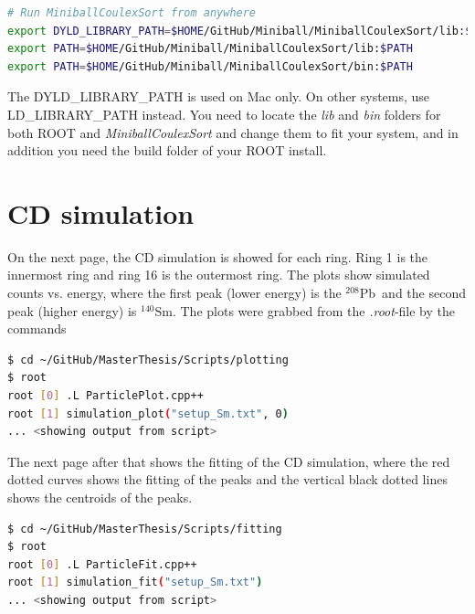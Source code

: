 \documentclass[twoside,english]{uiofysmaster/uiofysmaster}
\newcommand{\Sm}{$^{140}$Sm} %
\newcommand{\Pb}{$^{208}$Pb}
\begin{document}
\begin{appendices}
\begin{lstlisting}[language=sh]
# Run MiniballCoulexSort from anywhere
export DYLD_LIBRARY_PATH=$HOME/GitHub/Miniball/MiniballCoulexSort/lib:$DYLD_LIBRARY_PATH
export PATH=$HOME/GitHub/Miniball/MiniballCoulexSort/lib:$PATH
export PATH=$HOME/GitHub/Miniball/MiniballCoulexSort/bin:$PATH
\end{lstlisting}
The DYLD\_LIBRARY\_PATH is used on Mac only. On other systems, use \newline LD\_LIBRARY\_PATH instead. You need to locate the \textit{lib} and \textit{bin} folders for both ROOT and \textsl{MiniballCoulexSort} and change them to fit your system, and in addition you need the build folder of your ROOT install.


\chapter{CD simulation}\label{ch:cd_sim}
On the next page, the CD simulation is showed for each ring. Ring 1 is the innermost ring and ring 16 is the outermost ring. The plots show simulated counts vs. energy, where the first peak (lower energy) is the \Pb\ and the second peak (higher energy) is \Sm. The plots were grabbed from the \textit{.root}-file by the commands

\begin{lstlisting}[language=sh]
$ cd ~/GitHub/MasterThesis/Scripts/plotting
$ root
root [0] .L ParticlePlot.cpp++
root [1] simulation_plot("setup_Sm.txt", 0)
... <showing output from script>
\end{lstlisting}

The next page after that shows the fitting of the CD simulation, where the red dotted curves shows the fitting of the peaks and the vertical black dotted lines shows the centroids of the peaks.

\begin{lstlisting}[language=sh]
$ cd ~/GitHub/MasterThesis/Scripts/fitting
$ root
root [0] .L ParticleFit.cpp++
root [1] simulation_fit("setup_Sm.txt")
... <showing output from script>
\end{lstlisting}







\end{appendices}



%


\end{document}
